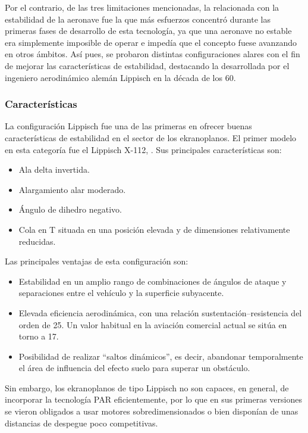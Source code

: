 Por el contrario, de las tres limitaciones mencionadas, la relacionada con la estabilidad de la aeronave fue la que más esfuerzos concentró durante las primeras fases de desarrollo de esta tecnología, ya que una aeronave no estable era simplemente imposible de operar e impedía que el concepto fuese avanzando en otros ámbitos. Así pues, se probaron distintas configuraciones alares con el fin de mejorar las características de estabilidad, destacando la desarrollada por el ingeniero aerodinámico alemán Lippisch en la década de los 60.


\subsubsection{Características}
\label{sec:wig:lippisch:characteristics}

La configuración Lippisch fue una de las primeras en ofrecer buenas características de estabilidad en el sector de los ekranoplanos. El primer modelo en esta categoría fue el Lippisch X-112, . Sus principales características son:
\begin{itemize}
\item Ala delta invertida.
\item Alargamiento alar moderado.
\item Ángulo de dihedro negativo.
\item Cola en T situada en una posición elevada y de dimensiones relativamente reducidas.
\end{itemize}

Las principales ventajas de esta configuración son:
\begin{itemize}
\item Estabilidad en un amplio rango de combinaciones de ángulos de ataque y separaciones entre el vehículo y la superficie subyacente.
\item Elevada eficiencia aerodinámica, con una relación sustentación–resistencia del orden de 25. Un valor habitual en la aviación comercial actual se sitúa en torno a 17.
\item Posibilidad de realizar “saltos dinámicos”, es decir, abandonar temporalmente el área de influencia del efecto suelo para superar un obstáculo.
\end{itemize}

Sin embargo, los ekranoplanos de tipo Lippisch no son capaces, en general, de incorporar la tecnología PAR eficientemente, por lo que en sus primeras versiones se vieron obligados a usar motores sobredimensionados o bien disponían de unas distancias de despegue poco competitivas.

